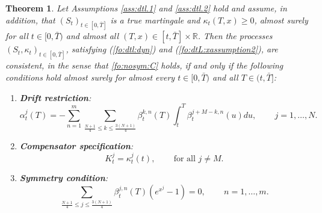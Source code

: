 \documentclass{article}
\numberwithin{equation}{section}
\newtheorem{theorem}{Theorem}
\newcommand\RR {\mathbb R}
\def\bT{\bar{T}}
\begin{document}
\begin{theorem}\label{th:dtl.consist}
Let Assumptions \ref{ass:dtl.1} and \ref{ass:dtl.2} hold and assume, in addition, that $\left(S_t\right)_{t\in[0,\bT]}$ is a true martingale and $\kappa_t(T,x)\geq0$, almost surely for all $t\in[0,\bT)$ and almost all $(T,x)\in[t,\bT]\times\RR$.
Then the processes $\left(S_t,\kappa_t\right)_{t\in[0,\bT]}$, satisfying (\ref{fo:dtl:dyn}) and (\ref{fo:dtL:xassumption2}),  are \emph{consistent}, in the sense that \eqref{fo:nosym:C} holds, if and only if the following conditions hold almost surely for almost every
$t\in[0,\bT)$ and all $T\in(t,\bT]$:
\begin{enumerate}

\item \textbf{Drift restriction}:
\begin{equation} \label{fo:dtL:driftcondition}
\alpha_t^j(T) = -\sum_{n=1}^m \sum_{\frac{N+1}{4} \le k \le \frac{3(N+1)}{4}}\beta_t^{k,n}(T) \int_t^T \beta_t^{j+M-k,n}(u) du,\,\,\,\,\,\,\,\,\,\,\,\,\,j=1,\ldots,N.
\end{equation}

\item \textbf{Compensator specification}:
\begin{equation}\label{fo:dtL:K}
K^j_t = \kappa^j_t(t),\,\,\,\,\,\,\,\,\,\,\,\,\,\text{for all}\,\,j\neq M.
\end{equation}

\item \textbf{Symmetry condition}:
\begin{equation}\label{fo:dtL:sym}
\sum_{\frac{N+1}{4} \le j \le \frac{3(N+1)}{4}} \beta^{j,n}_t(T) (e^{x^j}-1) = 0,
\,\,\,\,\,\,\,\,\,\,\,\,\,n=1,\ldots,m.
\end{equation}
\end{enumerate}
\end{theorem}
\end{document}
